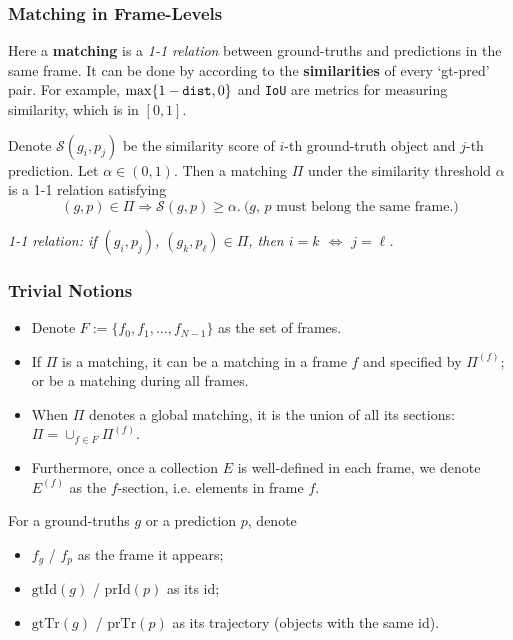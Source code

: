 \documentclass[slidetop, mathserif]{beamer}
\begin{document}
\begin{frame}
	\frametitle{Matching in Frame-Levels}
	
	Here a {\bf matching} is a \emph{1-1 relation} between ground-truths
	and predictions in the same frame.
	It can be done by according to the {\bf similarities} of every `gt-pred' pair.
	For example, $\max\{1-\text{\tt dist}, 0\}$ and {\tt IoU} are metrics for
	measuring similarity, which is in $[0,1]$.
	
	\vspace{4pt}
	
	Denote $\mathcal S(g_i, p_j)$ be the similarity score of $i$-th ground-truth object
	and $j$-th prediction. Let $\alpha\in(0,1)$.
	Then a matching $\Pi$ under the similarity threshold $\alpha$ is a 1-1 relation
	satisfying
	\[
		(g,p) \in \Pi \Rightarrow \mathcal S(g, p) \geq \alpha. ~ \text{($g$, $p$ must belong the same frame.)}
	\]
	
	
	\emph{1-1 relation: if $(g_i, p_j)$, $(g_k, p_\ell)\in \Pi$,
		then $i=k$ $\Leftrightarrow$ $j=\ell$.}
	
\end{frame}

\begin{frame}
	\frametitle{Trivial Notions}
	
	\begin{itemize}
		\item Denote $F:=\{f_0, f_1, \ldots, f_{N-1}\}$ as the set of frames.
		\item If $\Pi$ is a matching, it can be a matching in a frame $f$ and specified by $\Pi^{(f)}$;
		      or be a matching during all frames.
		\item When $\Pi$ denotes a global matching, it is the union of all its sections:
		      $\Pi = \cup_{f\in F}\Pi^{(f)}$.
		\item Furthermore, once a collection $E$ is well-defined in each frame,
		      we denote $E^{(f)}$ as the $f$-section, i.e. elements in frame $f$.
		      
	\end{itemize}
	
	For a ground-truths $g$ or a prediction $p$, denote
	\begin{itemize}
		\item $f_g$ / $f_p$ as the frame it appears;
		\item $\text{gtId}(g)$ / $\text{prId}(p)$ as its id;
		\item $\text{gtTr}(g)$ / $\text{prTr}(p)$ as its trajectory (objects with the same id).
	\end{itemize}
\end{frame}
\end{document}
